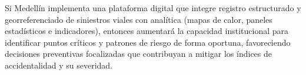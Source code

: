 Si Medellín implementa una plataforma digital que integre registro estructurado y georreferenciado de siniestros viales con analítica (mapas de calor, paneles estadísticos e indicadores), entonces aumentará la capacidad institucional para identificar puntos críticos y patrones de riesgo de forma oportuna, favoreciendo decisiones preventivas focalizadas que contribuyan a mitigar los índices de accidentalidad y su severidad.